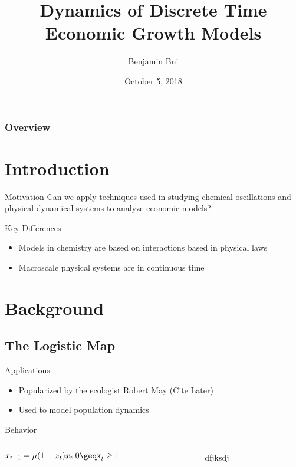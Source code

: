 \documentclass{beamer}
\title{Dynamics of Discrete Time Economic Growth Models}
\author{Benjamin Bui}
\date{October 5, 2018}
\begin{document}
\begin{frame}
	\titlepage
\end{frame}

\begin{frame}
	\frametitle{Overview}
	\tableofcontents
\end{frame}

\section{Introduction}
\begin{frame}{Motivation}
	Can we apply techniques used in studying chemical oscillations and physical dynamical systems to analyze economic models?
\end{frame}

\begin{frame}{Key Differences}
	\begin{itemize}
		\item
			Models in chemistry are based on interactions based in physical laws
		\pause
		\item
			Macroscale physical systems are in continuous time
	\end{itemize}
\end{frame}

\section{Background}
\subsection*{The Logistic Map}

\begin{frame}{Applications}
	\begin{itemize}
		\item
		 	Popularized by the ecologist Robert May (Cite Later)
		\item
			Used to model population dynamics
	\end{itemize}
\end{frame}

\begin{frame}{Behavior}
	\begin{columns}
		\begin{column}{0.5\textwidth}
			$x_{t+1}=\mu(1-x_t)x_t|0\geqx_t\geq 1$
		\end{column}
		\begin{column}{0.5\textwidth}
			dfjksdj
		\end{column}
	\end{columns}
\end{frame}
\end{document}

